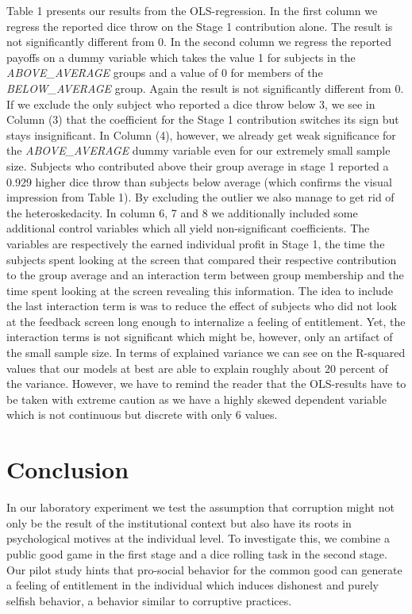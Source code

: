 \documentclass[12pt, a4paper]{article}
\begin{document}
Table 1 presents our results from the OLS-regression. In the first column we regress the reported dice throw on the Stage 1 contribution alone. The result is not significantly different from 0. In the second column we regress the reported payoffs on a dummy variable which takes the value 1 for subjects in the \emph{ABOVE\_AVERAGE} groups and a value of 0 for members of the \emph{BELOW\_AVERAGE} group. Again the result is not significantly different from 0. If we exclude the only subject who reported a dice throw below 3, we see in Column (3) that the coefficient for the Stage 1 contribution switches its sign but stays insignificant. In Column (4), however, we already get weak significance for the \emph{ABOVE\_AVERAGE} dummy variable even for our extremely small sample size. Subjects who contributed above their group average in stage 1 reported a 0.929 higher dice throw than subjects below average (which confirms the visual impression from Table 1). By excluding the outlier we also manage to get rid of the heteroskedacity.   In column 6, 7 and 8 we additionally included some additional control variables which all yield non-significant coefficients. The variables are respectively the earned individual profit in Stage 1, the time the subjects spent looking at the screen that compared their respective contribution to the group average and an interaction term between group membership and the time spent looking at the screen revealing this information. The idea to include the last interaction term is was to reduce the effect of subjects who did not look at the feedback screen long enough to internalize a feeling of entitlement. Yet, the interaction terms is not significant which might be, however, only an artifact of the small sample size. In terms of explained variance we can see  on the R-squared values that our models at best are able to explain roughly about 20 percent of the variance.
However, we have to remind the reader that the OLS-results have to be taken with extreme caution as we have a highly skewed dependent variable which is not continuous but discrete with only 6 values.

\section{Conclusion}
In our laboratory experiment we test the assumption that corruption might not only be the result of the institutional context but also have its roots in psychological motives at the individual level. To investigate this, we combine a public good game in the first stage and a dice rolling task in the second stage.
Our pilot study hints that pro-social behavior for the common good can generate a feeling of entitlement in the individual which induces dishonest and purely selfish behavior, a behavior similar to corruptive practices.
\end{document}
